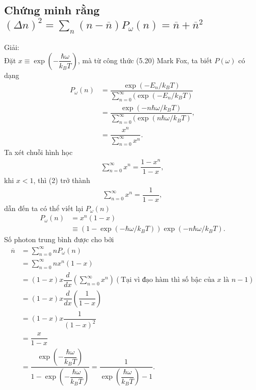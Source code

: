 \documentclass{article}
\newcommand{\dps}{\displaystyle}
\newcommand{\f}[2]{\dfrac{#1}{#2}}
\begin{document}
\subsection*{Chứng minh rằng $(\Delta n)^2 = \dps\sum_{n} (n - \overline{n}) P_{\omega}(n) = \overline{n} + \overline{n}^2$}
Giải: \\
Đặt $x \equiv \exp(-\f{\hbar \omega}{k_B T})$, mà từ công thức (5.20) Mark Fox, ta biết $P(\omega)$ có dạng
\begin{align*}
	P_{\omega}(n)
	 & = \f{\exp(-E_{n} / k_B T)}{\sum_{n = 0}^{\infty}(\exp(-E_{n} / k_B T)}                   \\
	 & = \f{\exp(-n \hbar \omega / k_B T)}{\sum_{n = 0}^{\infty}(\exp(n \hbar \omega / k_B T)}, \\
	 & = \f{x^{n}}{\sum_{n = 0}^{\infty} x^{n}}. \tag{1}
\end{align*}
Ta xét chuỗi hình học
\begin{align*}
	\sum_{n = 0}^{\infty} x^{n} = \f{1 - x^n}{1 - x} \tag{2},
\end{align*}
khi $x<1$, thì (2) trở thành
\begin{align*}
	\sum_{n = 0}^{\infty} x^{n} = \f{1}{1 - x}, \tag{3}
\end{align*}
dẫn đến ta có thể viết lại $P_{\omega}(n)$
\begin{align*}
	P_{\omega}(n)
	 & = x^{n} (1-x)                                                                               \\
	 & \equiv \left( 1 - \exp(-\hbar \omega / k_B T) \right) \exp(-n\hbar \omega / k_B T). \tag{4}
\end{align*}
Số photon trung bình được cho bởi
\begin{align*}
	\overline{n}
	 & = \sum_{n = 0}^{\infty} n P_{\omega}(n)                                                                                \\
	 & = \sum_{n = 0}^{\infty} n x^{n} (1-x)                                                                                  \\
	 & = (1 - x) x \f{d}{dx} \left( \sum_{n = 0}^{\infty} x^{n} \right) (\text{Tại vì đạo hàm thì số bậc của $x$ là $n - 1$}) \\
	 & = (1 - x) x \f{d}{dx} \left(\f{1}{1 - x}\right) \\
	 & = (1 - x) x \f{1}{(1 - x)^2} \\
	 & = \f{x}{1 - x} \\
	 & = \f{\exp(-\f{\hbar \omega}{k_B T})}{1 - \exp(-\f{\hbar \omega}{k_B T})} = \f{1}{\exp(\f{\hbar \omega}{k_B T}) - 1} . \tag{5}
\end{align*}
\end{document}
